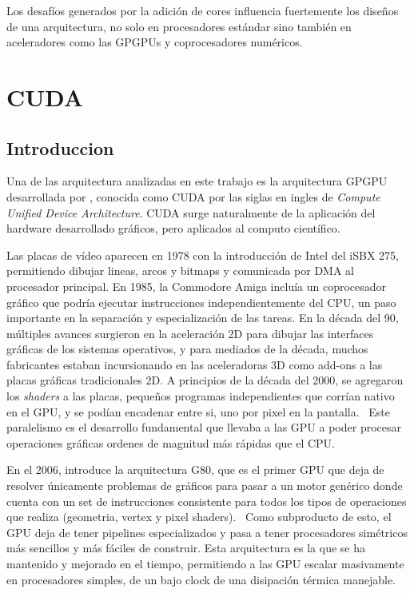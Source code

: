 Los desaf\'ios generados por la adici\'on de cores influencia fuertemente los dise\~nos de una arquitectura, no solo en
procesadores est\'andar sino tambi\'en en aceleradores como las GPGPUs y coprocesadores num\'ericos.

\section{CUDA}

\subsection{Introduccion}

Una de las arquitectura analizadas en este trabajo es la arquitectura GPGPU desarrollada por \nvidia, conocida
como CUDA por las siglas en ingles de \textit{Compute Unified Device Architecture}.
CUDA surge naturalmente de la aplicaci\'on del hardware desarrollado gr\'aficos, pero aplicados al computo cient\'ifico.

Las placas de v\'ideo aparecen en 1978 con la introducci\'on de Intel del iSBX 275, permitiendo dibujar lineas,
arcos y bitmaps y comunicada por DMA al procesador principal. En 1985, la Commodore Amiga inclu\'ia un coprocesador
gr\'afico que podr\'ia ejecutar instrucciones independientemente del CPU, un paso importante en la separaci\'on
y especializaci\'on de las tareas. En la d\'ecada del 90, m\'ultiples
avances surgieron en la aceleraci\'on 2D para dibujar las interfaces gr\'aficas de los sistemas operativos,
y para mediados de la d\'ecada, muchos fabricantes estaban incursionando en las aceleradoras 3D como
add-ons a las placas gr\'aficas tradicionales 2D. A principios de la d\'ecada del 2000, se agregaron los
\textit{shaders} a las placas, peque\~nos programas independientes que corr\'ian nativo en el GPU,
y se pod\'ian encadenar entre si, uno por pixel en la pantalla.~\cite{CG} Este paralelismo es el desarrollo fundamental
que llevaba a las GPU a poder procesar operaciones gr\'aficas ordenes de magnitud m\'as r\'apidas que el CPU.

En el 2006, \nvidia introduce la arquitectura G80,
que es el primer GPU que deja de resolver \'unicamente problemas de gr\'aficos
para pasar a un motor gen\'erico donde cuenta con un set de instrucciones consistente para todos los
tipos de operaciones que realiza (geometria, vertex y pixel shaders).~\cite{cudaHandbook} Como subproducto de esto,
el GPU deja de tener pipelines especializados y pasa a tener procesadores sim\'etricos m\'as sencillos y m\'as
f\'aciles de construir. Esta arquitectura es la que se ha mantenido y mejorado en el tiempo, permitiendo
a las GPU escalar masivamente en procesadores simples, de un bajo clock de una disipaci\'on t\'ermica
manejable.

